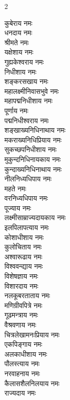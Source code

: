 \begin{multicols}{2}
\begin{flushleft}
कुबेराय नमः\\
धनदाय नमः\\
श्रीमते नमः\\
यक्षेशाय नमः\\
गुह्यकेश्वराय नमः\\
निधीशाय नमः\\
शङ्करसखाय नमः\\
महालक्ष्मीनिवासभुवे नमः\\
महापद्मनिधीशाय नमः\\
पूर्णाय नमः\hfill{}\\ %
पद्मनिधीश्वराय नमः\\
शङ्खाख्यनिधिनाथाय नमः\\
मकराख्यनिधिप्रियाय नमः\\
सुकच्छपनिधीशाय नमः\\
मुकुन्दनिधिनायकाय नमः\\
कुन्दाख्यनिधिनाथाय नमः\\
नीलनिध्यधिपाय नमः\\
महते नमः\\
वरनिध्यधिपाय नमः\\
पूज्याय नमः\hfill{}\\ %
लक्ष्मीसाम्राज्यदायकाय नमः\\
इलपिलापत्याय नमः\\
कोशाधीशाय नमः\\
कुलोचिताय नमः\\
अश्वारूढाय नमः\\
विश्ववन्द्याय नमः\\
विशेषज्ञाय नमः\\
विशारदाय नमः\\
नलकूबरताताय नमः\\
मणिग्रीवपित्रे नमः\hfill{}\\ %
गूढमन्त्राय नमः\\
वैश्रवणाय नमः\\
चित्रलेखामनःप्रियाय नमः\\
एकपिङ्गाय नमः\\
अलकाधीशाय नमः\\
पौलस्त्याय नमः\\
नरवाहनाय नमः\\
कैलासशैलनिलयाय नमः\\
राज्यदाय नमः\\

\end{flushleft}
\end{multicols}
